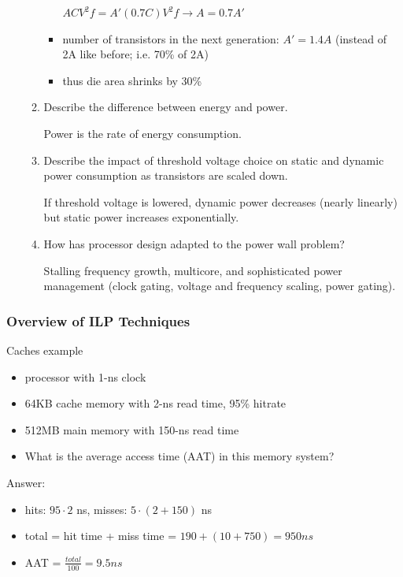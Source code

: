 \documentclass[12pt]{extarticle}
\begin{document}
\begin{itemize}
\begin{enumerate}
\begin{itemize}
					$ACV^2f = A'(0.7C)V^2f \longrightarrow A = 0.7A'$

					\item number of transistors in the next generation: $A' = 1.4A$ (instead of 2A like before; i.e. 70\% of 2A)
					\item thus die area shrinks by 30\%
				\end{itemize}

				\item Describe the difference between energy and power.

				Power is the rate of energy consumption.

				\item Describe the impact of threshold voltage choice on static and dynamic power consumption as transistors are scaled down.

				If threshold voltage is lowered, dynamic power decreases (nearly linearly) but static power increases exponentially.

				\item How has processor design adapted to the power wall problem?

				Stalling frequency growth, multicore, and sophisticated power management (clock gating, voltage and frequency scaling, power gating).
			\end{enumerate}

    \end{itemize}

	\subsubsection{Overview of ILP Techniques}

	Caches example

	\begin{itemize}
		\item processor with 1-ns clock
		\item 64KB cache memory with 2-ns read time, 95\% hitrate
		\item 512MB main memory with 150-ns read time
		\item What is the average access time (AAT) in this memory system?
	\end{itemize}

	Answer:
	\begin{itemize}
		\item hits: $95 \cdot 2$ ns, misses: $5 \cdot (2 + 150)$ ns
		\item total = hit time + miss time = $190 + (10 + 750) = 950 ns$
		\item AAT = $\frac{total}{100} = 9.5ns$
	\end{itemize}
\end{document}
